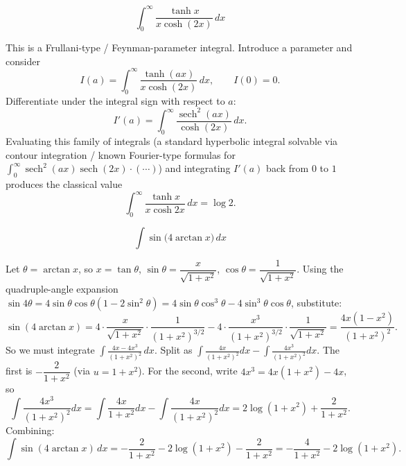 \begin{questions}
\question \[\int_0^\infty \frac{\tanh x}{x\cosh(2x)}\,dx\]
\begin{solution}
This is a Frullani-type / Feynman-parameter integral. Introduce a parameter and consider
\[I(a)=\int_0^\infty \frac{\tanh(ax)}{x\cosh(2x)}\,dx,\qquad I(0)=0.\]
Differentiate under the integral sign with respect to $a$:
\[I'(a)=\int_0^\infty \frac{\operatorname{sech}^2(ax)}{\cosh(2x)}\,dx.\]
Evaluating this family of integrals (a standard hyperbolic integral solvable via contour integration / known Fourier-type formulas for $\int_0^\infty\operatorname{sech}^2(ax)\operatorname{sech}(2x)\cdot(\cdots)$) and integrating $I'(a)$ back from $0$ to $1$ produces the classical value
\[\int_0^\infty\frac{\tanh x}{x\cosh2x}\,dx=\log2.\]
\end{solution}

\question \[\int \sin\big(4\arctan x\big)\,dx\]
\begin{solution}
Let $\theta=\arctan x$, so $x=\tan\theta$, $\sin\theta=\dfrac{x}{\sqrt{1+x^2}}$, $\cos\theta=\dfrac{1}{\sqrt{1+x^2}}$. Using the quadruple-angle expansion $\sin4\theta=4\sin\theta\cos\theta(1-2\sin^2\theta)=4\sin\theta\cos^3\theta-4\sin^3\theta\cos\theta$, substitute:
\[\sin(4\arctan x)=4\cdot\frac{x}{\sqrt{1+x^2}}\cdot\frac1{(1+x^2)^{3/2}}-4\cdot\frac{x^3}{(1+x^2)^{3/2}}\cdot\frac1{\sqrt{1+x^2}}=\frac{4x(1-x^2)}{(1+x^2)^2}.\]
So we must integrate $\displaystyle\int \frac{4x-4x^3}{(1+x^2)^2}\,dx$. Split as $\displaystyle\int\frac{4x}{(1+x^2)^2}dx-\int\frac{4x^3}{(1+x^2)^2}dx$. The first is $-\dfrac{2}{1+x^2}$ (via $u=1+x^2$). For the second, write $4x^3=4x(1+x^2)-4x$, so
\[\int\frac{4x^3}{(1+x^2)^2}dx=\int\frac{4x}{1+x^2}dx-\int\frac{4x}{(1+x^2)^2}dx=2\log(1+x^2)+\frac{2}{1+x^2}.\]
Combining:
\[\int\sin(4\arctan x)\,dx=-\frac2{1+x^2}-2\log(1+x^2)-\frac2{1+x^2}=-\frac4{1+x^2}-2\log(1+x^2).\]
\end{solution}

\end{questions}

